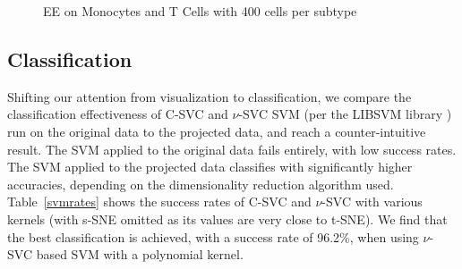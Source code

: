 \documentclass{article}
\begin{document}
\begin{figure}[h!]
\vskip 0.2in
\begin{center}
\quad
{}\quad
\end{center}
\caption{EE on Monocytes and T Cells with 400 cells per subtype}
\label{EEmonocytesandtcells}
\vskip -0.2in
\end{figure}

\subsection{Classification}
Shifting our attention from visualization to classification, we compare the classification effectiveness of C-SVC and $\nu$-SVC SVM (per the LIBSVM library \cite{Chang:2011dt}) run on the original data to the projected data, and reach a counter-intuitive result. The SVM applied to the original data fails entirely, with low success rates. The SVM applied to the projected data classifies with significantly higher accuracies, depending on the dimensionality reduction algorithm used. Table~\ref{svmrates} shows the success rates of C-SVC and $\nu$-SVC with various kernels (with s-SNE omitted as its values are very close to t-SNE). We find that the best classification is achieved, with a success rate of 96.2\%, when using $\nu$-SVC based SVM with a polynomial kernel. 
\end{document}
